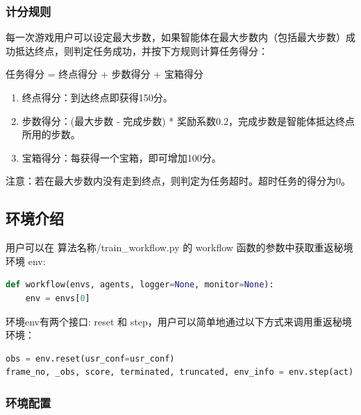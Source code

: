 \subsubsection{计分规则}

每一次游戏用户可以设定最大步数，如果智能体在最大步数内（包括最大步数）成功抵达终点，则判定任务成功，并按下方规则计算任务得分：

任务得分 = 终点得分 + 步数得分 + 宝箱得分

\begin{enumerate}
    \item 终点得分：到达终点即获得150分。
    \item 步数得分：(最大步数 - 完成步数) * 奖励系数0.2，完成步数是智能体抵达终点所用的步数。
    \item 宝箱得分：每获得一个宝箱，即可增加100分。
\end{enumerate}

注意：若在最大步数内没有走到终点，则判定为任务超时。超时任务的得分为0。

\subsection{环境介绍}

用户可以在 算法名称/train\_workflow.py 的 workflow 函数的参数中获取重返秘境环境 env:

\begin{adjustbox}{width=0.8\textwidth, center}
\begin{lstlisting}[language=Python]
def workflow(envs, agents, logger=None, monitor=None):
    env = envs[0] 
\end{lstlisting}
\end{adjustbox}

\quad

环境env有两个接口: reset 和 step，用户可以简单地通过以下方式来调用重返秘境环境：

\quad

\begin{adjustbox}{width=0.8\textwidth, center}
\begin{lstlisting}[language=Python]
obs = env.reset(usr_conf=usr_conf)
frame_no, _obs, score, terminated, truncated, env_info = env.step(act)
\end{lstlisting}
\end{adjustbox}

\subsubsection{环境配置}

